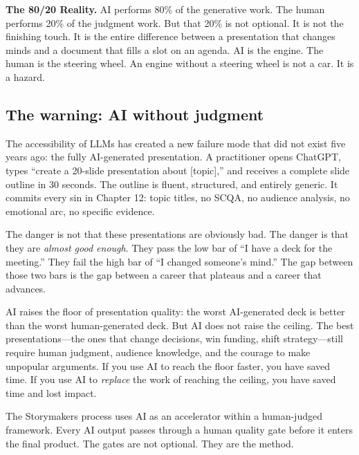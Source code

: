 \begin{diagnosisbox}
\textbf{The 80/20 Reality.} AI performs 80\% of the generative work. The human performs 20\% of the judgment work. But that 20\% is not optional. It is not the finishing touch. It is the entire difference between a presentation that changes minds and a document that fills a slot on an agenda. AI is the engine. The human is the steering wheel. An engine without a steering wheel is not a car. It is a hazard.
\end{diagnosisbox}

\subsection{The warning: AI without judgment}

The accessibility of LLMs has created a new failure mode that did not exist five years ago: the fully AI-generated presentation. A practitioner opens ChatGPT, types ``create a 20-slide presentation about [topic],'' and receives a complete slide outline in 30 seconds. The outline is fluent, structured, and entirely generic. It commits every sin in Chapter 12: topic titles, no SCQA, no audience analysis, no emotional arc, no specific evidence.

The danger is not that these presentations are obviously bad. The danger is that they are \emph{almost good enough}. They pass the low bar of ``I have a deck for the meeting.'' They fail the high bar of ``I changed someone's mind.'' The gap between those two bars is the gap between a career that plateaus and a career that advances.

\begin{alertbox}
AI raises the floor of presentation quality: the worst AI-generated deck is better than the worst human-generated deck. But AI does not raise the ceiling. The best presentations---the ones that change decisions, win funding, shift strategy---still require human judgment, audience knowledge, and the courage to make unpopular arguments. If you use AI to reach the floor faster, you have saved time. If you use AI to \emph{replace} the work of reaching the ceiling, you have saved time and lost impact.
\end{alertbox}

The Storymakers process uses AI as an accelerator within a human-judged framework. Every AI output passes through a human quality gate before it enters the final product. The gates are not optional. They are the method.


\clearpage
